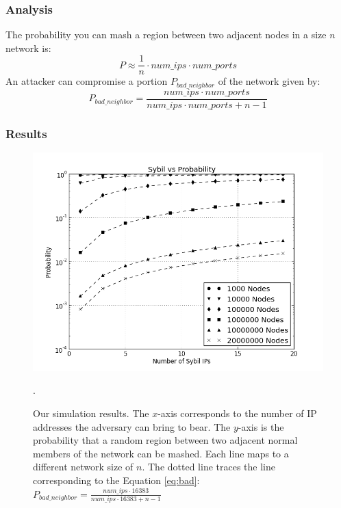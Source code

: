 \documentclass[11pt]{beamer}
\begin{document}
\begin{frame}
    \frametitle{Analysis}
    The probability you can mash a region between two adjacent nodes in a size $n$ network is:
     \begin{equation}
    P \approx \frac{1}{n}\cdot num\_ips \cdot num\_ports
    \end{equation}
    An attacker can compromise a portion $ P_{bad\_neighbor} $ of the network given by:
    \begin{equation}
    P_{bad\_neighbor} =  \frac{num\_ips \cdot num\_ports}{num\_ips \cdot num\_ports + n - 1}
    \label{eq:bad}
    \end{equation}
    
\end{frame}


\subsubsection{Results}

\begin{frame}
    \begin{figure}
        \centering
        \includegraphics[width=0.65\linewidth]{figs/ip_prob_all}
        \caption[foo]{Our simulation results.  
            The $x$-axis corresponds to the number of IP addresses the adversary can bring to bear.
            The $y$-axis is the probability that a random region between two adjacent normal members of the network can be mashed.
            Each line maps to a different network size of $n$.
            The dotted line traces the line corresponding to the Equation \ref{eq:bad}: $ P_{bad\_neighbor} =  \frac{num\_ips \cdot 16383}{num\_ips \cdot 16383 + n - 1}$}.
        \label{fig:exp2}
    \end{figure}
\end{frame}
\end{document}
